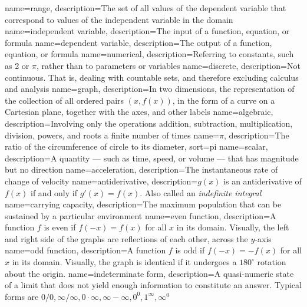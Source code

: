 {
  name=range,
  description={The set of all values of the dependent variable that correspond to values of the
  independent variable in the domain}
}
{
  name={independent variable},
  description={The input of a function, equation, or formula}
}
{
  name={dependent variable},
  description={The output of a function, equation, or formula}
}
{
  name=numerical,
  description={Referring to constants, such as 2 or {\ensuremath{\pi}}, rather than to parameters
  	or variables}
}
{
  name=discrete,
  description={Not continuous.  That is, dealing with countable sets, and therefore excluding
  calculus and analysis}
}
{
  name=graph,
  description={In two dimensions, the representation of the collection of all ordered pairs $(x, f(x))$, in the form of a curve on a Cartesian plane, together with the axes, and other labels}
}
{
  name=algebraic,
  description={Involving only the operations addition, subtraction, multiplication, division, powers, and roots a finite number of times}
}
{
  name={\ensuremath{\pi}},
  description={The ratio of the circumference of circle to its diameter},
  sort=pi
}
{
  name=scalar,
  description={A quantity --- such as time, speed, or volume --- that has magnitude but no direction}
}
{
  name=acceleration,
  description={The instantaneous rate of change of velocity}
}
{
  name=antiderivative,
  description={$g(x)$ is an antiderivative of $f(x)$ if and only if $g'(x)=f(x)$.  Also called an \textit{indefinite integral}}
}
{
  name={carrying capacity},
  description={The maximum population that can be sustained by a particular environment}
}
{
  name={even function},
  description={A function $f$ is even if $f(-x) = f(x)$ for all $x$ in its domain.  Visually, the
  left and right side of the graphs are reflections of each other, across the $y$-axis}
}
{
	name={odd function},
	description={A function $f$ is odd if $f(-x) = -f(x)$ for all $x$ in its domain.  Visually, the graph is identical if it undergoes a $180^\circ$ rotation about the origin.}
}
{
	name={indeterminate form},
	description={A quasi-numeric state of a limit that does not yield enough information to constitute an answer.  Typical forms are $0/0, \infty/\infty, 0 \cdot{} \infty, \infty - \infty, 0^0, 1^\infty, \infty^0$}
}









